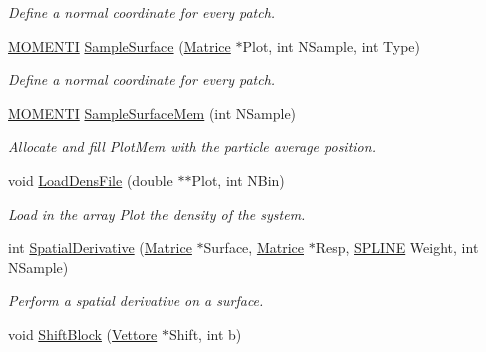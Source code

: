 \begin{DoxyCompactItemize}
\begin{DoxyCompactList}\small\item\em Define a normal coordinate for every patch. \end{DoxyCompactList}\item 
\hyperlink{structMOMENTI}{M\+O\+M\+E\+N\+TI} \hyperlink{classVarData_a08ba09477a7030851fe661865a926019}{Sample\+Surface} (\hyperlink{classMatrice}{Matrice} $\ast$Plot, int N\+Sample, int Type)\hypertarget{classVarData_a08ba09477a7030851fe661865a926019}{}\label{classVarData_a08ba09477a7030851fe661865a926019}

\begin{DoxyCompactList}\small\item\em Define a normal coordinate for every patch. \end{DoxyCompactList}\item 
\hyperlink{structMOMENTI}{M\+O\+M\+E\+N\+TI} \hyperlink{classVarData_ac4c0e38f73d520530288e3195983d71e}{Sample\+Surface\+Mem} (int N\+Sample)\hypertarget{classVarData_ac4c0e38f73d520530288e3195983d71e}{}\label{classVarData_ac4c0e38f73d520530288e3195983d71e}

\begin{DoxyCompactList}\small\item\em Allocate and fill Plot\+Mem with the particle average position. \end{DoxyCompactList}\item 
void \hyperlink{classVarData_aae93aa599f6d47f4656e7e995ffc8ef0}{Load\+Dens\+File} (double $\ast$$\ast$Plot, int N\+Bin)\hypertarget{classVarData_aae93aa599f6d47f4656e7e995ffc8ef0}{}\label{classVarData_aae93aa599f6d47f4656e7e995ffc8ef0}

\begin{DoxyCompactList}\small\item\em Load in the array Plot the density of the system. \end{DoxyCompactList}\item 
int \hyperlink{classVarData_a5d41a4adc43927d71fa72494b0a989ce}{Spatial\+Derivative} (\hyperlink{classMatrice}{Matrice} $\ast$Surface, \hyperlink{classMatrice}{Matrice} $\ast$Resp, \hyperlink{structSPLINE}{S\+P\+L\+I\+NE} Weight, int N\+Sample)\hypertarget{classVarData_a5d41a4adc43927d71fa72494b0a989ce}{}\label{classVarData_a5d41a4adc43927d71fa72494b0a989ce}

\begin{DoxyCompactList}\small\item\em Perform a spatial derivative on a surface. \end{DoxyCompactList}\item 
void \hyperlink{classVarData_a366bfde743eb134002b75d4a983f93e6}{Shift\+Block} (\hyperlink{classVettore}{Vettore} $\ast$Shift, int b)\hypertarget{classVarData_a366bfde743eb134002b75d4a983f93e6}{}\label{classVarData_a366bfde743eb134002b75d4a983f93e6}


\end{DoxyCompactItemize}
